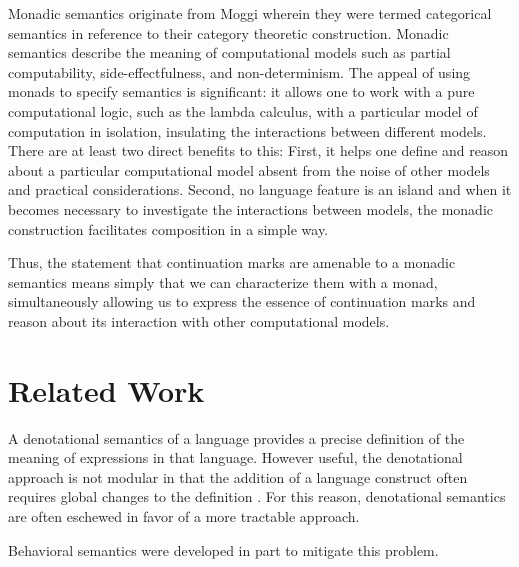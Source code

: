 \documentclass[ms]{byuprop}
\begin{document}
Monadic semantics originate from Moggi \cite{moggi1989computational} wherein they were
termed categorical semantics in reference to their category theoretic construction.
Monadic semantics describe the meaning of computational models such as partial
computability, side-effectfulness, and non-determinism. The appeal of using monads to
specify semantics is significant: it allows one to work with a pure computational logic,
such as the lambda calculus, with a particular model of computation in isolation,
insulating the interactions between different models. There are at least two direct
benefits to this: First, it helps one define and reason about a particular computational
model absent from the noise of other models and practical considerations. Second, no
language feature is an island and when it becomes necessary to investigate the
interactions between models, the monadic construction facilitates composition in a simple
way.


Thus, the statement that continuation marks are amenable to a monadic semantics means
simply that we can characterize them with a monad, simultaneously allowing us to express
the essence of continuation marks and reason about its interaction with other
computational models.


\section{Related Work}

A denotational semantics of a language provides a precise definition of the meaning of
expressions in that language. However useful, the denotational approach is not modular in
that the addition of a language construct often requires global changes to the definition
\cite{liang2009modular}. For this reason, denotational semantics are often eschewed in
favor of a more tractable approach.

Behavioral semantics were developed in part to mitigate this problem.

\end{document}
